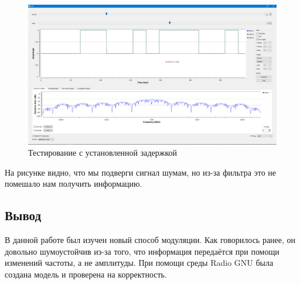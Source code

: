     \begin{figure}[H]
	\begin{center}
		\includegraphics[scale=0.27]{fig/lab12/lab12_04.png}
		\caption{Тестирование с установленной задержкой}
		\label{pic:e1} %
	\end{center}
\end{figure}

На рисунке видно, что мы подверги сигнал шумам, но из-за фильтра это не помешало нам получить информацию.

\subsection{Вывод}
В данной работе был изучен новый способ модуляции. Как говорилось ранее, он довольно шумоустойчив из-за того, что информация передаётся при помощи изменений частоты, а не амплитуды. При помощи среды Radio GNU была создана модель и проверена на корректность.